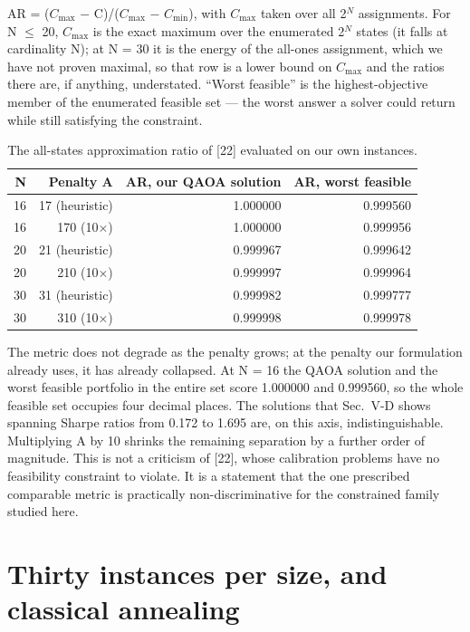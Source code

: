 \documentclass[journal]{IEEEtran}
\begin{document}
AR = ($C_{\mathrm{max}}$ $-$ C)/($C_{\mathrm{max}}$ $-$ $C_{\mathrm{min}}$), with $C_{\mathrm{max}}$ taken over all 2$^{N}$ assignments. For N $\leq$ 20, $C_{\mathrm{max}}$ is the exact maximum over the enumerated 2$^{N}$ states (it falls at cardinality N); at N = 30 it is the energy of the all-ones assignment, which we have not proven maximal, so that row is a lower bound on $C_{\mathrm{max}}$ and the ratios there are, if anything, understated. ``Worst feasible'' is the highest-objective member of the enumerated feasible set --- the worst answer a solver could return while still satisfying the constraint.


\begin{table}[!t]
\centering
\footnotesize
\caption{The all-states approximation ratio of [22] evaluated on our own instances.}
\label{tab:S8}
\begin{tabular}{rrrr}
\toprule
N & Penalty A & AR, our QAOA solution & AR, worst feasible \\
\midrule
16 & 17 (heuristic) & 1.000000 & 0.999560 \\
16 & 170 (10$\times$) & 1.000000 & 0.999956 \\
20 & 21 (heuristic) & 0.999967 & 0.999642 \\
20 & 210 (10$\times$) & 0.999997 & 0.999964 \\
30 & 31 (heuristic) & 0.999982 & 0.999777 \\
30 & 310 (10$\times$) & 0.999998 & 0.999978 \\
\bottomrule
\end{tabular}
\end{table}


The metric does not degrade as the penalty grows; at the penalty our formulation already uses, it has already collapsed. At N = 16 the QAOA solution and the worst feasible portfolio in the entire set score 1.000000 and 0.999560, so the whole feasible set occupies four decimal places. The solutions that Sec.~V-D shows spanning Sharpe ratios from 0.172 to 1.695 are, on this axis, indistinguishable. Multiplying A by 10 shrinks the remaining separation by a further order of magnitude. This is not a criticism of [22], whose calibration problems have no feasibility constraint to violate. It is a statement that the one prescribed comparable metric is practically non-discriminative for the constrained family studied here.


\section{Thirty instances per size, and classical annealing}
\end{document}
